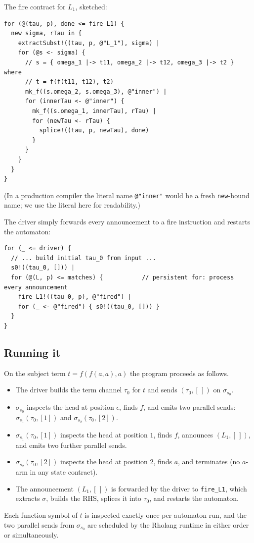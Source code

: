 \documentclass[11pt]{article}
\theoremstyle{plain}
\theoremstyle{definition}
\theoremstyle{remark}
\begin{document}
The fire contract for $L_1$, sketched:
\begin{lstlisting}
for (@(tau, p), done <= fire_L1) {
  new sigma, rTau in {
    extractSubst!((tau, p, @"L_1"), sigma) |
    for (@s <- sigma) {
      // s = { omega_1 |-> t11, omega_2 |-> t12, omega_3 |-> t2 } where
      // t = f(f(t11, t12), t2)
      mk_f((s.omega_2, s.omega_3), @"inner") |
      for (innerTau <- @"inner") {
        mk_f((s.omega_1, innerTau), rTau) |
        for (newTau <- rTau) {
          splice!((tau, p, newTau), done)
        }
      }
    }
  }
}
\end{lstlisting}
(In a production compiler the literal name \texttt{@"inner"} would be a
fresh \texttt{new}-bound name; we use the literal here for readability.)

The driver simply forwards every announcement to a fire instruction and
restarts the automaton:
\begin{lstlisting}
for (_ <= driver) {
  // ... build initial tau_0 from input ...
  s0!((tau_0, [])) |
  for (@(L, p) <= matches) {           // persistent for: process every announcement
    fire_L1!((tau_0, p), @"fired") |
    for (_ <- @"fired") { s0!((tau_0, [])) }
  }
}
\end{lstlisting}

\subsection{Running it}

On the subject term $t = f(f(a, a), a)$ the program proceeds as
follows.
\begin{itemize}[leftmargin=*]
  \item The driver builds the term channel $\tau_0$ for $t$ and sends
        $(\tau_0, [\,])$ on $\sigma_{s_0}$.
  \item $\sigma_{s_0}$ inspects the head at position $\epsilon$,
        finds $f$, and emits two parallel sends:
        $\sigma_{s_1}(\tau_0, [1])$ and $\sigma_{s_2}(\tau_0, [2])$.
  \item $\sigma_{s_1}(\tau_0, [1])$ inspects the head at position $1$,
        finds $f$, announces $(L_1, [\,])$, and emits two further
        parallel sends.
  \item $\sigma_{s_2}(\tau_0, [2])$ inspects the head at position $2$,
        finds $a$, and terminates (no $a$-arm in any state contract).
  \item The announcement $(L_1, [\,])$ is forwarded by the driver to
        \texttt{fire\_L1}, which extracts $\sigma$, builds the RHS,
        splices it into $\tau_0$, and restarts the automaton.
\end{itemize}
Each function symbol of $t$ is inspected exactly once per automaton run,
and the two parallel sends from $\sigma_{s_0}$ are scheduled by the
Rholang runtime in either order or simultaneously.
\end{document}
